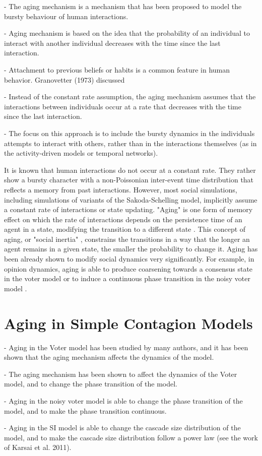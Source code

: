 - The aging mechanism is a mechanism that has been proposed to model the bursty behaviour of human interactions.

- Aging mechanism is based on the idea that the probability of an individual to interact with another individual decreases with the time since the last interaction.

- Attachment to previous beliefs or habits is a common feature in human behavior. Granovetter (1973) discussed 

- Instead of the constant rate assumption, the aging mechanism assumes that the interactions between individuals occur at a rate that decreases with the time since the last interaction.

- The focus on this approach is to include the bursty dynamics in the individuals attempts to interact with others, rather than in the interactions themselves (as in the activity-driven models or temporal networks).

It is known that human interactions do not occur at a constant rate. They rather show  a bursty character with a non-Poissonian inter-event time distribution that reflects a memory from past interactions. \cite{barabasi-2005,moro,oriol,rybski-2012,zignani-2016,kumar-2020}
However, most social simulations, including simulations of variants of the Sakoda-Schelling model, implicitly assume a constant rate of interactions or state updating. "Aging" is one form of memory effect on which the rate of interactions depends on the persistence time of an agent in a state, modifying the transition to a different state \cite{fernandez-gracia-2011,perez-2016,boguna-2014}. This concept of aging, or "social inertia" \cite{Stark2008}, constrains the transitions in a way that the longer an agent remains in a given state, the smaller the probability to change it. Aging has been already shown to modify social dynamics very significantly. For example, in opinion dynamics, aging is able to produce coarsening towards a consensus state in the voter model \cite{fernandez-gracia-2011,peralta-2020} or to induce a continuous phase transition in the noisy voter model \cite{artime-2018}.

\section{\label{sec:Aging in Simple Contagion Models} Aging in Simple Contagion Models}

- Aging in the Voter model has been studied by many authors, and it has been shown that the aging mechanism affects the dynamics of the model.

- The aging mechanism has been shown to affect the dynamics of the Voter model, and to change the phase transition of the model.

- Aging in the noisy voter model is able to change the phase transition of the model, and to make the phase transition continuous.

- Aging in the SI model is able to change the cascade size distribution of the model, and to make the cascade size distribution follow a power law (see the work of Karsai et al. 2011).